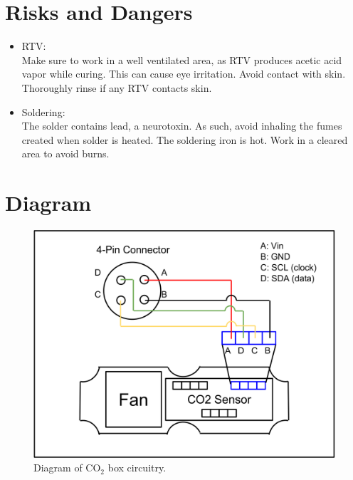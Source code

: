 \documentclass[letterpaper,12pt]{article}
\begin{document}
\section{Risks and Dangers}
	\begin{itemize}
		\item RTV: \\
		\textnormal{Make sure to work in a well ventilated area, as RTV produces acetic acid vapor while curing. This can cause eye irritation. Avoid contact with skin. Thoroughly rinse if any RTV contacts skin.}
		\item Soldering: \\
		\textnormal{The solder contains lead, a neurotoxin. As such, avoid inhaling the fumes created when solder is heated. The soldering iron is hot. Work in a cleared area to avoid burns.}
	\end{itemize}

\newpage

\section{Diagram} \label{diagram}
	\begin{figure} [!htb]
		\centering
		\includegraphics[width=1\textwidth]{diagram_1.png}
		\caption{Diagram of CO$_2$ box circuitry.}
		\label{fig:diagram}
	\end{figure}

\end{document}
